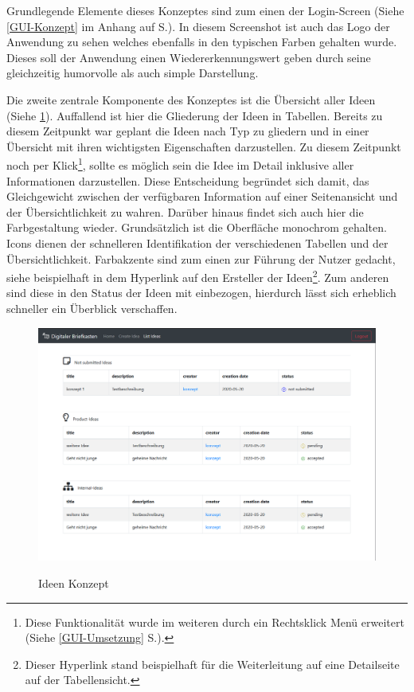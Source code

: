 Grundlegende Elemente dieses Konzeptes sind zum einen der Login-Screen (Siehe \ref{GUI-Konzept} im Anhang auf S.\pageref{GUI-Konzept}).
In diesem Screenshot ist auch das Logo der Anwendung zu sehen welches ebenfalls in den typischen Farben gehalten wurde. Dieses soll der Anwendung einen Wiedererkennungswert geben durch seine gleichzeitig humorvolle als auch simple Darstellung.

Die zweite zentrale Komponente des Konzeptes ist die Übersicht aller Ideen (Siehe \cref{fig:ideen}).
Auffallend ist hier die Gliederung der Ideen in Tabellen. Bereits zu diesem Zeitpunkt war geplant die Ideen nach Typ zu gliedern und in einer Übersicht mit ihren wichtigsten Eigenschaften darzustellen.
Zu diesem Zeitpunkt noch per Klick\footnote{Diese Funktionalität wurde im weiteren durch ein Rechtsklick Menü erweitert (Siehe \ref{GUI-Umsetzung} S.\pageref{GUI-Umsetzung}).}, sollte es möglich sein die Idee im Detail inklusive aller Informationen darzustellen. Diese Entscheidung begründet sich damit, das Gleichgewicht zwischen der verfügbaren Information auf einer Seitenansicht und der Übersichtlichkeit zu wahren.
Darüber hinaus findet sich auch hier die Farbgestaltung wieder. Grundsätzlich ist die Oberfläche monochrom gehalten. Icons dienen der schnelleren Identifikation der verschiedenen Tabellen und der Übersichtlichkeit. Farbakzente sind zum einen zur Führung der Nutzer gedacht, siehe beispielhaft in dem Hyperlink auf den Ersteller der Ideen\footnote{Dieser Hyperlink stand beispielhaft für die Weiterleitung auf eine Detailseite auf der Tabellensicht.}. Zum anderen sind diese in den Status der Ideen mit einbezogen, hierdurch lässt sich erheblich schneller ein Überblick verschaffen.

\begin{figure}[h!!]
    \centering
    \begin{minipage}[t]{1\textwidth}
        \caption{Ideen Konzept}
        \includegraphics[width=1\textwidth]{img/ideen-Konzept.png}\\
        \label{fig:ideen}
    \end{minipage}
\end{figure}

